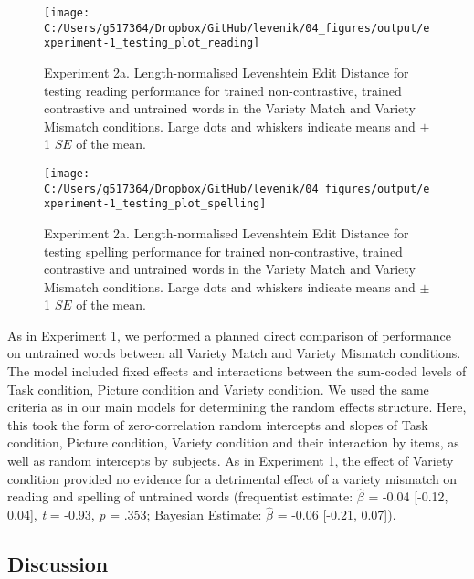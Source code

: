 \documentclass[doc,floatsintext]{apa6}
\begin{document}
\newpage

\begin{figure}[H]

{\centering \texttt{[image: C:/Users/g517364/Dropbox/GitHub/levenik/04\_figures/output/experiment-1\_testing\_plot\_reading]} 

}

\caption{Experiment 2a. Length-normalised Levenshtein Edit Distance for testing reading performance for trained non-contrastive, trained contrastive and untrained words in the Variety Match and Variety Mismatch conditions. Large dots and whiskers indicate means and $\pm$ 1 $SE$ of the mean.}\label{fig:ex1-test-reading-plots}
\end{figure}

\newpage

\begin{figure}[H]

{\centering \texttt{[image: C:/Users/g517364/Dropbox/GitHub/levenik/04\_figures/output/experiment-1\_testing\_plot\_spelling]} 

}

\caption{Experiment 2a. Length-normalised Levenshtein Edit Distance for testing spelling performance for trained non-contrastive, trained contrastive and untrained words in the Variety Match and Variety Mismatch conditions. Large dots and whiskers indicate means and $\pm$ 1 $SE$ of the mean.}\label{fig:ex1-test-spelling-plots}
\end{figure}

As in Experiment 1, we performed a planned direct comparison of
performance on untrained words between all Variety Match and Variety
Mismatch conditions. The model included fixed effects and interactions
between the sum-coded levels of Task condition, Picture condition and
Variety condition. We used the same criteria as in our main models for
determining the random effects structure. Here, this took the form of
zero-correlation random intercepts and slopes of Task condition, Picture
condition, Variety condition and their interaction by items, as well as
random intercepts by subjects. As in Experiment 1, the effect of Variety
condition provided no evidence for a detrimental effect of a variety
mismatch on reading and spelling of untrained words (frequentist
estimate: \(\hat{\beta}\) = -0.04 {[}-0.12, 0.04{]}, \emph{t} = -0.93,
\emph{p} = .353; Bayesian Estimate: \(\hat{\beta}\) = -0.06 {[}-0.21,
0.07{]}).

\subsection{Discussion}\label{discussion-1}
\end{document}
